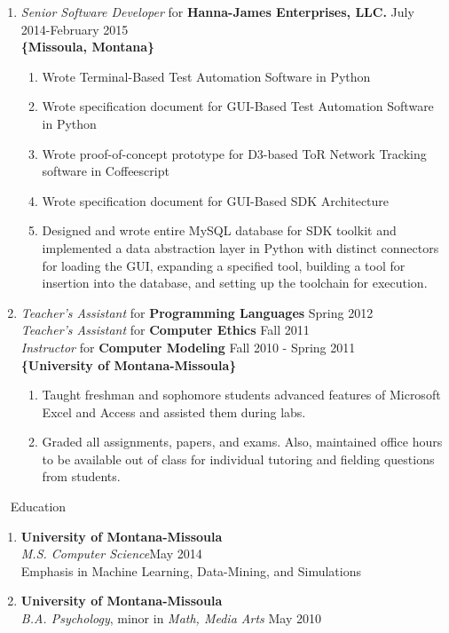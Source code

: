 \documentclass[oneside]{article}%
\begin{document}
\begin{enumerate}[]
	\item \textit{Senior Software Developer} for \textbf{Hanna-James Enterprises, LLC.} \hfill July 2014-February 2015\\
		\textbf{\{Missoula, Montana\}}
		\begin{enumerate}[*]
			\item Wrote Terminal-Based Test Automation Software in Python
			\item Wrote specification document for GUI-Based Test Automation Software in Python
			\item Wrote proof-of-concept prototype for D3-based ToR Network Tracking software in Coffeescript
			\item Wrote specification document for GUI-Based SDK Architecture
			\item Designed and wrote entire MySQL database for SDK toolkit and implemented a data abstraction layer in Python with distinct connectors for loading the GUI, expanding a specified tool, building a tool for insertion into the database, and setting up the toolchain for execution.
		\end{enumerate}
	\item \textit{Teacher's Assistant} for \textbf{Programming Languages} \hfill Spring 2012\\
		\textit{Teacher's Assistant} for \textbf{Computer Ethics} \hfill Fall 2011\\
		\textit{Instructor} for \textbf{Computer Modeling} \hfill Fall 2010 - Spring 2011\\
		\textbf{\{University of Montana-Missoula\}}
		\begin{enumerate}[*]
			\item Taught freshman and sophomore students advanced features of Microsoft Excel and Access and assisted them during labs.
			\item Graded all assignments, papers, and exams. Also, maintained office hours to be available out of class for individual tutoring and fielding questions from students.
		\end{enumerate}
\end{enumerate}
\
\noindent
\huge{Education}
\normalsize
\begin{enumerate}[]
\item \textbf{University of Montana-Missoula}\\
\vspace{2mm}
	\textit{M.S. Computer Science}\hfill May 2014\\
	Emphasis in Machine Learning, Data-Mining, and Simulations
	\
\item \textbf{University of Montana-Missoula}\\
	\textit{B.A. Psychology}, minor in \textit{Math, Media Arts} \hfill May 2010
	\
\end{enumerate}
\end{document}
